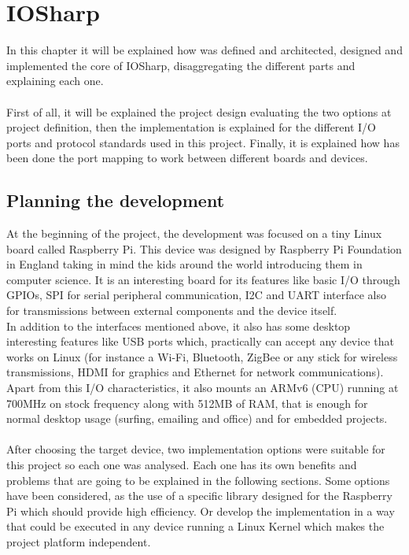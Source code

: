 \chapter{IOSharp}\label{C:IOSharp development}
In this chapter it will be explained how was defined and architected, designed and implemented the core of IOSharp, disaggregating the different parts and explaining each one.
\\
\\
First of all, it will be explained the project design evaluating the two options at project definition, then the implementation is explained for the different I/O ports and protocol standards used in this project. Finally, it is explained how has been done the port mapping to work between different boards and devices.

\section{Planning the development}\label{S:IOSharp-Design}
At the beginning of the project, the development was focused on a tiny Linux board called Raspberry Pi. This device was designed by Raspberry Pi Foundation in England taking in mind the kids around the world introducing them in computer science. It is an interesting board for its features like basic I/O through GPIOs, \gls{SPI} for serial peripheral communication, \gls{I2C} and UART interface also for transmissions between external components and the device itself.
\\
In addition to the interfaces mentioned above, it also has some desktop interesting features like USB ports which, practically can accept any device that works on Linux (for instance a Wi-Fi, Bluetooth, ZigBee or any stick for wireless transmissions, HDMI for graphics and Ethernet for network communications). Apart from this I/O characteristics, it also mounts an ARMv6 (CPU) running at 700MHz on stock frequency along with 512MB of RAM, that is enough for normal desktop usage (surfing, emailing and office) and for embedded projects.
\\
\\
After choosing the target device, two implementation options were suitable for this project so each one was analysed. Each one has its own benefits and problems that are going to be explained in the following sections. Some options have been considered, as the use of a specific library designed for the Raspberry Pi which should provide high efficiency. Or develop the implementation in a way that could be executed in any device running a Linux Kernel which makes the project platform independent.


